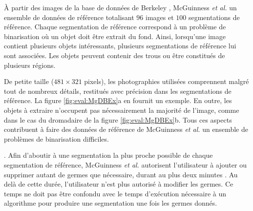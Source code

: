 À partir des images de la base de données de Berkeley \cite{MartinFTM01}, McGuinness \textit{et al.}  un ensemble de données de référence totalisant $96$ images et $100$ segmentations de référence. Chaque segmentation de référence correspond à un problème de binarisation où un objet doit être extrait du fond. Ainsi, lorsqu'une image contient plusieurs objets intéressants, plusieurs segmentations de référence lui sont associées. Les objets peuvent contenir des trous ou être constitués de plusieurs régions. 

De petite taille ($481 \times 321$ pixels), les photographies utilisées comprennent malgré tout de nombreux détails, restitués avec précision dans les segmentations de référence. La figure \ref{fig:eval:MgDBEx}a en fournit un exemple. En outre, les objets à extraire n'occupent pas nécessairement la majorité de l'image, comme dans le cas du dromadaire de la figure \ref{fig:eval:MgDBEx}b. Tous ces aspects contribuent à faire des données de référence de McGuinness \textit{et al.} un ensemble de problèmes de binarisation difficiles.

. Afin d'aboutir à une segmentation la plus proche possible de chaque segmentation de référence, McGuinness \textit{et al.} autorisent l'utilisateur à ajouter ou supprimer autant de germes que nécessaire, durant au plus deux minutes .  Au delà de cette durée, l'utilisateur n'est plus autorisé à modifier les germes. Ce temps ne doit pas être confondu avec le temps d'exécution nécessaire à un algorithme pour produire une segmentation une fois les germes donnés.

